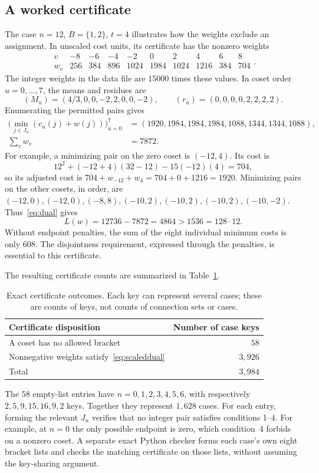 \documentclass[11pt]{article}
\theoremstyle{definition}
\begin{document}
\begin{appendices}
\subsection{A worked certificate}
The case $n=12$, $B=\{1,2\}$, $t=4$ illustrates how the weights exclude
an assignment. In unscaled cost units, its certificate has the nonzero
weights
\[
\begin{array}{c|rrrrrrrrr}
 v&-8&-6&-4&-2&0&2&4&6&8\\\hline
 w_v&256&384&896&1024&1984&1024&1216&384&704
\end{array}.
\]
The integer weights in the data file are $15000$ times these values.
In coset order $u=0,\ldots,7$, the means and residues are
\[
 (M_u)=(4/3,0,0,-2,2,0,0,-2),\qquad
 (r_u)=(0,0,0,0,2,2,2,2).
\]
Enumerating the permitted pairs gives
\begin{align*}
 \bigl(\min_{j\in J_u}(c_u(j)+w(j))\bigr)_{u=0}^7
    &=(1920,1984,1984,1984,1088,1344,1344,1088),\\
 \sum_v w_v&=7872.
\end{align*}
For example, a minimizing pair on the zero coset is $(-12,4)$.
Its cost is
\[
 12^2+(-12+4)(32-12)-15(-12)(4)=704,
\]
so its adjusted cost is $704+w_{-12}+w_4=704+0+1216=1920$.
Minimizing pairs on the other cosets, in order, are
$(-12,0),(-12,0),(-8,8),(-10,2),(-10,2),(-10,2),(-10,-2)$.
Thus~\eqref{eq:dual} gives
\[
 L(w)=12736-7872=4864>1536=128\cdot12.
\]
Without endpoint penalties, the sum of the eight individual minimum
costs is only $608$. The disjointness requirement, expressed through
the penalties, is essential to this certificate.

The resulting certificate counts are summarized in Table~\ref{tab:certificates}.
\begin{table}[htbp]
\centering
\begin{tabular}{lr}
\hline
Certificate disposition & Number of case keys\\
\hline
A coset has no allowed bracket & $58$\\
Nonnegative weights satisfy~\eqref{eq:scaleddual} & $3{,}926$\\
\hline
Total & $3{,}984$\\
\hline
\end{tabular}
\caption{Exact certificate outcomes. Each key can represent several
cases; these are counts of keys, not counts of connection sets or cases.}
\label{tab:certificates}
\end{table}
The $58$ empty-list entries have $n=0,1,2,3,4,5,6$, with respectively
$2,5,9,15,16,9,2$ keys. Together they represent $1{,}628$ cases.
For each entry, forming the relevant $J_u$ verifies that no integer pair
satisfies conditions 1--4. For example, at $n=0$ the only possible endpoint
is zero, which condition~4 forbids on a nonzero coset.
A separate exact Python checker forms each case's own eight bracket
lists and checks the matching certificate on those lists, without
assuming the key-sharing argument.

\end{appendices}
\end{document}
